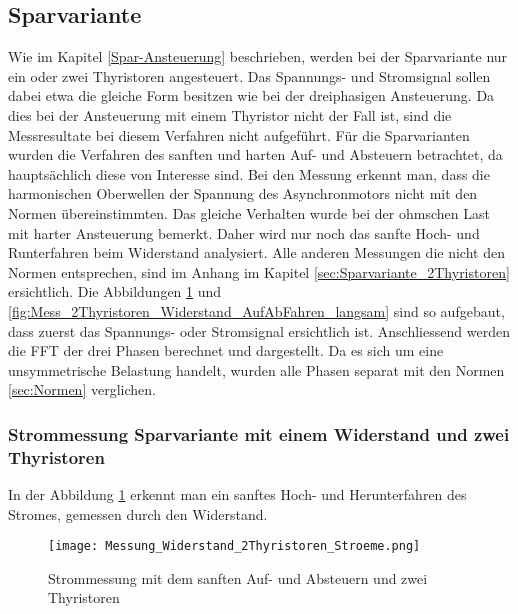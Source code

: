 \newpage
\subsection{Sparvariante}
Wie im Kapitel \ref{Spar-Ansteuerung} beschrieben, werden bei der Sparvariante nur ein oder zwei Thyristoren angesteuert. Das Spannungs- und Stromsignal sollen dabei etwa die gleiche Form besitzen wie bei der dreiphasigen Ansteuerung. Da dies bei der Ansteuerung mit einem Thyristor nicht der Fall ist, sind die Messresultate bei diesem Verfahren nicht aufgeführt. Für die Sparvarianten wurden die Verfahren des sanften und harten Auf- und Absteuern betrachtet, da hauptsächlich diese von Interesse sind. Bei den Messung erkennt man, dass die harmonischen Oberwellen der Spannung des Asynchronmotors nicht mit den Normen übereinstimmten. Das gleiche Verhalten wurde bei der ohmschen Last mit harter Ansteuerung bemerkt. Daher wird nur noch das sanfte Hoch- und Runterfahren beim Widerstand analysiert. Alle anderen Messungen die nicht den Normen entsprechen, sind im Anhang im Kapitel \ref{sec:Sparvariante_2Thyristoren} ersichtlich. Die Abbildungen \ref{fig:Mess_2Thyristoren_Widerstand_AufAbFahren_langsam_stroeme} und \ref{fig:Mess_2Thyristoren_Widerstand_AufAbFahren_langsam} sind so aufgebaut, dass zuerst das Spannungs- oder Stromsignal ersichtlich ist. Anschliessend werden die FFT der drei Phasen berechnet und dargestellt. Da es sich um eine unsymmetrische Belastung handelt, wurden alle Phasen separat mit den Normen \ref{sec:Normen} verglichen.

\subsubsection{Strommessung Sparvariante mit einem Widerstand und zwei Thyristoren}

In der Abbildung \ref{fig:Mess_2Thyristoren_Widerstand_AufAbFahren_langsam_stroeme} erkennt man ein sanftes Hoch- und Herunterfahren des Stromes, gemessen durch den Widerstand.

\begin{figure}[ht]
	\centering
	\texttt{[image: Messung\_Widerstand\_2Thyristoren\_Stroeme.png]}	
	\caption{Strommessung mit dem sanften Auf- und Absteuern und zwei Thyristoren}\label{fig:Mess_2Thyristoren_Widerstand_AufAbFahren_langsam_stroeme}	
\end{figure}

